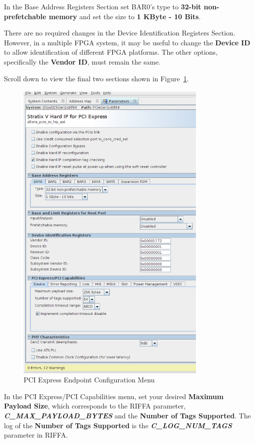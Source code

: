 \documentclass{refrep}
\newcommand{\ConfigSetting}[1]{\textbf{#1}}
\newcommand{\RIFFAParameter}[1]{\textit{\textbf{#1}}}
\begin{document}
In the Base Address Registers Section set BAR0's type to \ConfigSetting{32-bit
  non-prefetchable memory} and set the size to \ConfigSetting{1 KByte - 10 Bits}.

There are no required changes in the Device Identification Registers
Section. However, in a multiple FPGA system, it may be useful to change the
\ConfigSetting{Device ID} to allow identification of different FPGA
platforms. The other options, specifically the \ConfigSetting{Vendor ID}, must
remain the same.

Scroll down to view the final two sections shown in
Figure~\ref{Fig:Altera:QsysMegawizard:Megawizard:PCIExpressEndpoint2Trim}.
\begin{figure}[H]
  \includegraphics[width=350px,trim=0 0 0 620, clip=true,center]{PCIExpressEndpoint2Trim.png}
  \caption{PCI Express Endpoint Configuration Menu}
  \label{Fig:Altera:QsysMegawizard:Megawizard:PCIExpressEndpoint2Trim}
\end{figure}
In the PCI Express/PCI Capabilities menu, set your desired
\ConfigSetting{Maximum Payload Size}, which corresponds to the RIFFA parameter,
\RIFFAParameter{C\_MAX\_PAYLOAD\_BYTES} and the \ConfigSetting{Number of Tags
  Supported}. The log of the \ConfigSetting{Number of Tags Supported} is
the \RIFFAParameter{C\_LOG\_NUM\_TAGS} parameter in RIFFA.
\end{document}
